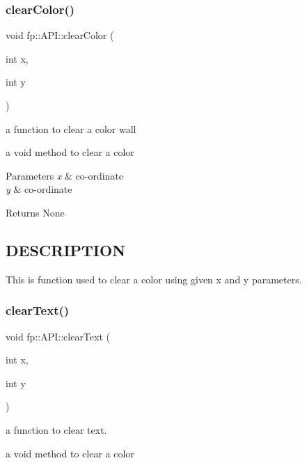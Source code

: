 \subsubsection{\texorpdfstring{clear\+Color()}{clearColor()}}
{\footnotesize\ttfamily void fp\+::\+A\+P\+I\+::clear\+Color (\begin{DoxyParamCaption}\item[{int}]{x,  }\item[{int}]{y }\end{DoxyParamCaption})\hspace{0.3cm}{\ttfamily [static]}}



a function to clear a color wall 

a void method to clear a color


\begin{DoxyParams}{Parameters}
{\em x} & co-\/ordinate \\
\hline
{\em y} & co-\/ordinate \\
\hline
\end{DoxyParams}
\begin{DoxyReturn}{Returns}
None 
\end{DoxyReturn}
\hypertarget{_m_a_z_e_8h_DESCRIPTION}{}\subsection{D\+E\+S\+C\+R\+I\+P\+T\+I\+ON}\label{_m_a_z_e_8h_DESCRIPTION}
This is function used to clear a color using given x and y parameters. \mbox{\label{classfp_1_1_a_p_i_a0b23c3b22476d1826987b93b518010d1}} 
\subsubsection{\texorpdfstring{clear\+Text()}{clearText()}}
{\footnotesize\ttfamily void fp\+::\+A\+P\+I\+::clear\+Text (\begin{DoxyParamCaption}\item[{int}]{x,  }\item[{int}]{y }\end{DoxyParamCaption})\hspace{0.3cm}{\ttfamily [static]}}



a function to clear text. 

a void method to clear a color


